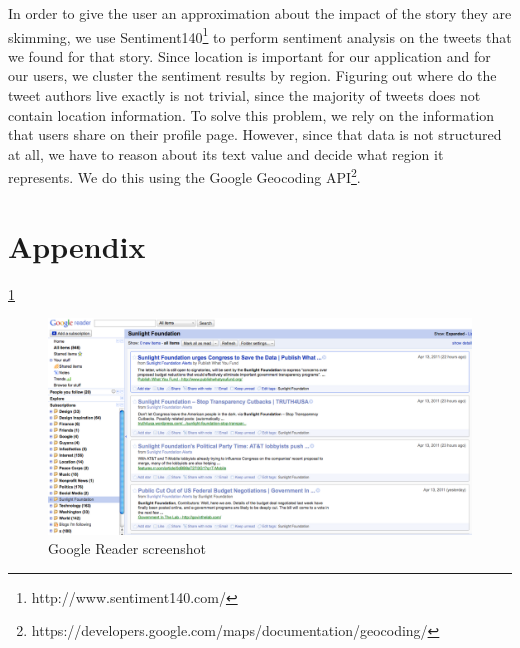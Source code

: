 \documentclass{acm_proc_10ptArticle-sp}
\begin{document}
In order to give the user an approximation about the impact of the story they are skimming, we use Sentiment140\footnote{http://www.sentiment140.com/} to perform sentiment analysis on the tweets that we found for that story. Since location is important for our application and for our users, we cluster the sentiment results by region. Figuring out where do the tweet authors live exactly is not trivial, since the majority of tweets does not contain location information. To solve this problem, we rely on the information that users share on their profile page. However, since that data is not structured at all, we have to reason about its text value and decide what region it represents. We do this using the Google Geocoding API\footnote{https://developers.google.com/maps/documentation/geocoding/}. 







\newpage

\onecolumn
\section{Appendix}

\ref{screenshot:reader}
\begin{figure}[H]
  \centering
  \includegraphics[width=0.9\linewidth]{img/Google-Reader.png}
  \caption{Google Reader screenshot}
  \label{screenshot:reader}
\end{figure}
\end{document}
